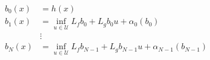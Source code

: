 \documentclass[preview]{standalone}
\begin{document}
\begin{align*}
b_0(x) &= h(x)\\ b_1(x) &= \inf_{u \in \mathcal{U}}  L_fb_0  +  L_gb_0 u +  \alpha_0(b_0 ) \\ &\vdots\\ b_N(x) &= \inf_{u \in \mathcal{U}}  L_fb_{N-1 }  +  L_gb_{N-1 }  u +  \alpha_{N-1}(b_{N-1 } )
\end{align*}
\end{document}
